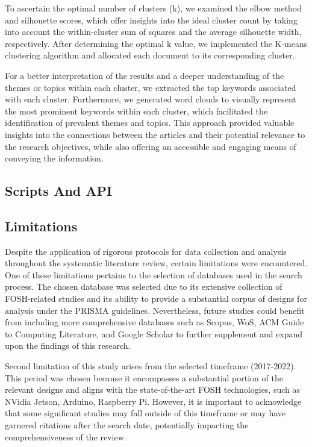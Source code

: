 To ascertain the optimal number of clusters (k), we examined the elbow method and silhouette scores, which offer insights into the ideal cluster count by taking into account the within-cluster sum of squares and the average silhouette width, respectively. After determining the optimal k value, we implemented the K-means clustering algorithm and allocated each document to its corresponding cluster.

For a better interpretation of the results and a deeper understanding of the themes or topics within each cluster, we extracted the top keywords associated with each cluster. Furthermore, we generated word clouds to visually represent the most prominent keywords within each cluster, which facilitated the identification of prevalent themes and topics. This approach provided valuable insights into the connections between the articles and their potential relevance to the research objectives, while also offering an accessible and engaging means of conveying the information.
\subsection{Scripts And API}

\subsection{Limitations}

Despite the application of rigorous protocols for data collection and analysis throughout the systematic literature review, certain limitations were encountered. One of these limitations pertains to the selection of databases used in the search process. The chosen database was selected due to its extensive collection of FOSH-related studies and its ability to provide a substantial corpus of designs for analysis under the PRISMA guidelines. Nevertheless, future studies could benefit from including more comprehensive databases such as Scopus, WoS, ACM Guide to Computing Literature, and Google Scholar to further supplement and expand upon the findings of this research.

Second limitation of this study arises from the selected timeframe (2017-2022). This period was chosen because it encompasses a substantial portion of the relevant designs and aligns with the state-of-the-art FOSH technologies, such as NVidia Jetson, Arduino, Raspberry Pi. However, it is important to acknowledge that some significant studies may fall outside of this timeframe or may have garnered citations after the search date, potentially impacting the comprehensiveness of the review.

